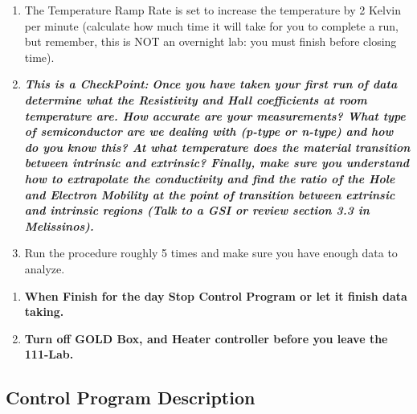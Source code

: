 \documentclass{../lab}
\begin{document}
\begin{enumerate}
    \item The Temperature Ramp Rate is set to increase the temperature by 2 Kelvin per minute (calculate how much time it will take for you to complete a run,  but remember, this is NOT an overnight lab: you must finish before closing time).

    \item \textbf{}\emph{\textbf{This is a CheckPoint:}} \emph{\textbf{Once you have taken your first run of data determine what the Resistivity and Hall coefficients at room temperature are. How accurate are your measurements? What type of semiconductor are we dealing with (p-type or n-type) and how do you know this? At what temperature does the material transition between intrinsic and extrinsic? Finally, make sure you understand how to extrapolate the conductivity and find the ratio of the Hole and Electron Mobility at the point of transition between extrinsic and intrinsic regions (Talk to a GSI or review section 3.3 in Melissinos). }}

    \item Run the procedure roughly 5 times and make sure you have enough data to analyze.

\end{enumerate}

\begin{enumerate}
    \item \textbf{When Finish for the day Stop Control Program or let it finish data taking.}

    \item \textbf{Turn off GOLD Box, and Heater controller before you leave the 111-Lab.}

\end{enumerate}

\subsection{Control Program Description}
\end{document}
